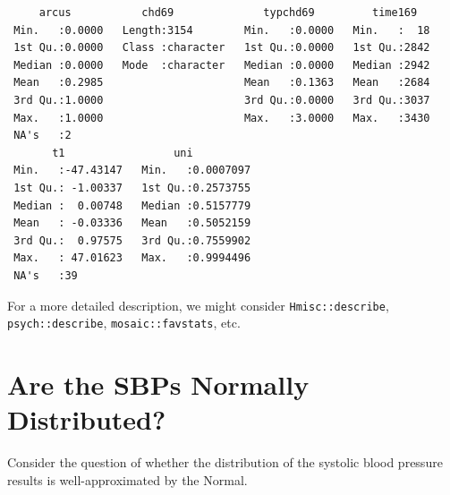 \documentclass[
]{book}
\begin{document}
\begin{verbatim}
     arcus           chd69              typchd69         time169    
 Min.   :0.0000   Length:3154        Min.   :0.0000   Min.   :  18  
 1st Qu.:0.0000   Class :character   1st Qu.:0.0000   1st Qu.:2842  
 Median :0.0000   Mode  :character   Median :0.0000   Median :2942  
 Mean   :0.2985                      Mean   :0.1363   Mean   :2684  
 3rd Qu.:1.0000                      3rd Qu.:0.0000   3rd Qu.:3037  
 Max.   :1.0000                      Max.   :3.0000   Max.   :3430  
 NA's   :2                                                          
       t1                 uni           
 Min.   :-47.43147   Min.   :0.0007097  
 1st Qu.: -1.00337   1st Qu.:0.2573755  
 Median :  0.00748   Median :0.5157779  
 Mean   : -0.03336   Mean   :0.5052159  
 3rd Qu.:  0.97575   3rd Qu.:0.7559902  
 Max.   : 47.01623   Max.   :0.9994496  
 NA's   :39                             
\end{verbatim}

For a more detailed description, we might consider \texttt{Hmisc::describe}, \texttt{psych::describe}, \texttt{mosaic::favstats}, etc.

\hypertarget{are-the-sbps-normally-distributed}{%
\section{Are the SBPs Normally Distributed?}\label{are-the-sbps-normally-distributed}}

Consider the question of whether the distribution of the systolic blood pressure results is well-approximated by the Normal.
\end{document}

